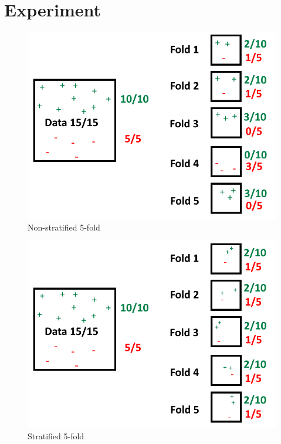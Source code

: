 \documentclass[a4paper,twoside]{bth}
\begin{document}
\section{Experiment}

\begin{figure}
\centering
\includegraphics[scale=0.5]{images/metod-images/kfold_normal_fold.png}
   \caption{Non-stratified 5-fold}
   \label{fig:extend}
\end{figure}

\begin{figure}
\centering
\includegraphics[scale=0.55]{images/metod-images/kfold_stratified_fold.png}
   \caption{Stratified 5-fold}
   \label{fig:extend}
\end{figure}
\end{document}
